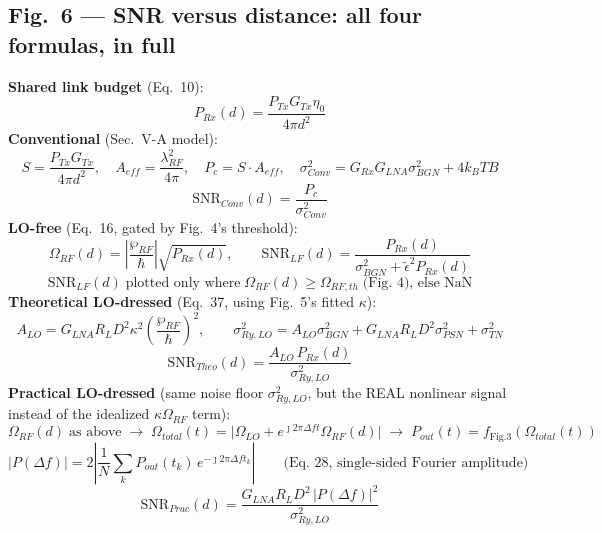 \documentclass[11pt]{article}
\begin{document}
\subsection*{Fig.~6 --- SNR versus distance: all four formulas, in full}
\textbf{Shared link budget} (Eq.~10):
\[
\boxed{P_{Rx}(d) = \frac{P_{Tx}G_{Tx}\eta_0}{4\pi d^2}}
\]
\textbf{Conventional} (Sec.~V-A model):
\[
S=\frac{P_{Tx}G_{Tx}}{4\pi d^2}, \quad A_{eff}=\frac{\lambda_{RF}^2}{4\pi}, \quad P_c=S\cdot A_{eff}, \quad \sigma^2_{Conv}=G_{Rx}G_{LNA}\sigma_{BGN}^2+4k_BTB
\]
\[
\boxed{\text{SNR}_{Conv}(d) = \frac{P_c}{\sigma^2_{Conv}}}
\]
\textbf{LO-free} (Eq.~16, gated by Fig.~4's threshold):
\[
\Omega_{RF}(d) = \left|\frac{\wp_{RF}}{\hbar}\right|\sqrt{P_{Rx}(d)}, \qquad
\text{SNR}_{LF}(d) = \frac{P_{Rx}(d)}{\sigma_{BGN}^2+\tilde\epsilon^2 P_{Rx}(d)}
\]
\[
\boxed{\text{SNR}_{LF}(d) \;\text{plotted only where}\; \Omega_{RF}(d) \ge \Omega_{RF,th}\;\text{(Fig.~4), else NaN}}
\]
\textbf{Theoretical LO-dressed} (Eq.~37, using Fig.~5's fitted $\kappa$):
\[
A_{LO} = G_{LNA}R_LD^2\kappa^2\left(\frac{\wp_{RF}}{\hbar}\right)^2, \qquad
\sigma_{Ry,LO}^2 = A_{LO}\sigma_{BGN}^2 + G_{LNA}R_LD^2\sigma_{PSN}^2+\sigma_{TN}^2
\]
\[
\boxed{\text{SNR}_{Theo}(d) = \frac{A_{LO}\,P_{Rx}(d)}{\sigma_{Ry,LO}^2}}
\]
\textbf{Practical LO-dressed} (same noise floor $\sigma_{Ry,LO}^2$, but the REAL nonlinear signal instead of the idealized $\kappa\Omega_{RF}$ term):
\[
\Omega_{RF}(d)\;\text{as above} \;\to\; \Omega_{total}(t) = \big|\Omega_{LO}+e^{\jmath2\pi\Delta f t}\Omega_{RF}(d)\big| \;\to\; P_{out}(t)=f_{\text{Fig.3}}(\Omega_{total}(t))
\]
\[
|P(\Delta f)| = 2\left|\frac{1}{N}\sum_{k} P_{out}(t_k)\,e^{-\jmath2\pi\Delta f t_k}\right| \qquad\text{(Eq.~28, single-sided Fourier amplitude)}
\]
\[
\boxed{\text{SNR}_{Prac}(d) = \frac{G_{LNA}R_LD^2\,|P(\Delta f)|^2}{\sigma_{Ry,LO}^2}}
\]
\begin{center}
\end{center}
\end{document}
